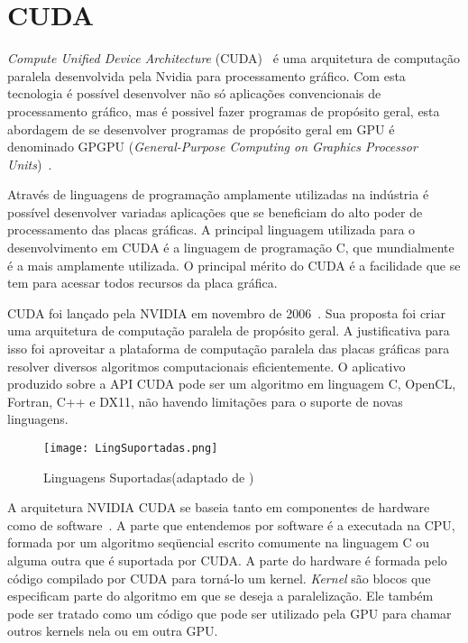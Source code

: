 \section{CUDA}\label{intro:contexto}

\textit{Compute Unified Device Architecture} (CUDA)~\cite{cuda} é uma arquitetura de computação paralela desenvolvida pela Nvidia para processamento gráfico.
Com esta tecnologia é possível desenvolver não só aplicações convencionais de processamento gráfico, mas é possivel fazer programas de propósito geral, esta abordagem de se desenvolver programas de propósito geral em GPU é denominado GPGPU (\textit{General-Purpose Computing on Graphics Processor Units})~\cite{GPGPU}.

Através de linguagens de programação amplamente utilizadas na indústria é possível desenvolver variadas aplicações que se beneficiam do alto poder de processamento das placas gráficas. A principal linguagem utilizada para o desenvolvimento em CUDA é a linguagem de
programação C, que mundialmente é a mais amplamente utilizada. O principal mérito do CUDA é a facilidade que se tem para acessar todos recursos da placa gráfica.

CUDA foi lançado pela NVIDIA em novembro de 2006~\cite{cuda}. Sua proposta foi criar uma arquitetura de computação paralela de propósito geral. A justificativa para isso foi aproveitar a plataforma de computação paralela das placas gráficas para resolver diversos algoritmos
computacionais eficientemente. O aplicativo produzido sobre a API CUDA pode ser um algoritmo em linguagem C, OpenCL, Fortran, C++ e DX11, não havendo limitações para o suporte de novas linguagens. 

\begin{figure}[htb]
	\begin{center}
	\centering
			\texttt{[image: LingSuportadas.png]}
	\label{fig: lingSuportadas}
	\caption{Linguagens Suportadas(adaptado de \cite{cuda})}
	\end{center}
\end{figure}

A arquitetura NVIDIA CUDA se baseia tanto em componentes de hardware como de software~\cite{cuda}. A parte que entendemos por software é a executada na CPU, formada por um algoritmo seqüencial escrito comumente na linguagem C ou alguma outra que é suportada por CUDA. A parte do hardware é formada pelo código compilado por CUDA para torná-lo um kernel. \textit{Kernel} são blocos que especificam parte do algoritmo em que se deseja a
paralelização. Ele também pode ser tratado como um código que pode ser utilizado pela GPU para chamar outros kernels nela ou em outra GPU.

